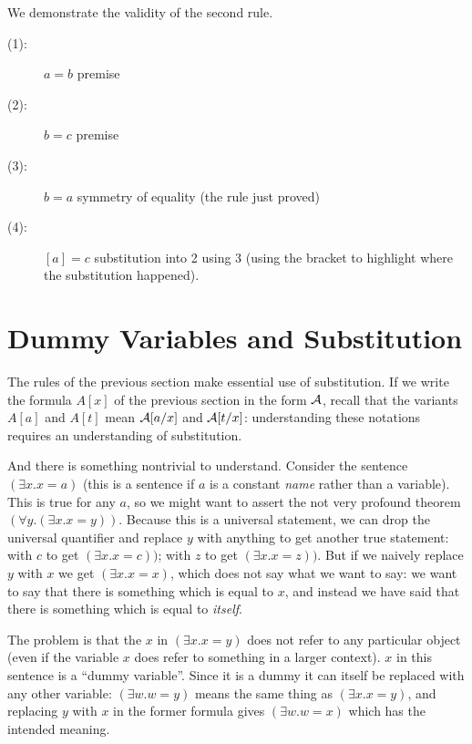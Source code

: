 \documentclass[12pt]{book}
\begin{document}
We demonstrate the validity of the second rule.

\begin{description}

\item[(1):]  $a=b$  premise

\item[(2):]  $b=c$ premise

\item[(3):] $b=a$  symmetry of equality (the rule just proved)

\item[(4):]  $[a]=c$  substitution into 2 using 3 (using the bracket to highlight where the substitution happened).

\end{description}

\section{Dummy Variables and Substitution}

The rules of the previous section make essential use of substitution.
If we write the formula $A[x]$ of the previous section in the form
$\cal A$, recall that the variants $A[a]$ and $A[t]$ mean ${\cal
A}[a/x]$ and ${\cal A}[t/x]$: understanding these notations requires
an understanding of substitution.

And there is something nontrivial to understand.  Consider the
sentence $(\exists x.x=a)$ (this is a sentence if $a$ is a constant
{\em name\/} rather than a variable).  This is true for any $a$, so we
might want to assert the not very profound theorem $(\forall
y.(\exists x.x=y))$.  Because this is a universal statement, we can
drop the universal quantifier and replace $y$ with anything to get
another true statement: with $c$ to get $(\exists x.x=c))$; with $z$
to get $(\exists x.x=z))$.  But if we naively replace $y$ with $x$ we
get $(\exists x.x=x)$, which does not say what we want to say: we want
to say that there is something which is equal to $x$, and instead we
have said that there is something which is equal to {\em itself\/}.

The problem is that the $x$ in $(\exists x.x=y)$ does not refer to any
particular object (even if the variable $x$ does refer to something in
a larger context).  $x$ in this sentence is a ``dummy variable''.
Since it is a dummy it can itself be replaced with any other variable:
$(\exists w.w=y)$ means the same thing as $(\exists x.x=y)$, and
replacing $y$ with $x$ in the former formula gives $(\exists w.w=x)$
which has the intended meaning.
\end{document}
